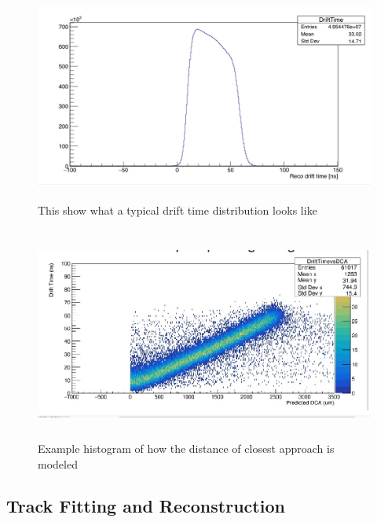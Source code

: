 \documentclass[./Thesis]{subfiles}
\begin{document}
	
\begin{figure}
	\centerline{\includegraphics[height=70mm]{drifttimedist.jpeg}}
	\caption[Drift Time Distibution]{ This show what a typical drift time distribution looks like}
	\label{fig:drifttimedist}
\end{figure} 

\begin{figure}
	\centerline{\includegraphics[height=70mm]{driftdca.jpeg}}
	\caption[Drift Time Distibution vs. The distance of closest approach]{ Example histogram of how the distance of closest approach is modeled	}
	\label{fig:driftdca}
\end{figure} 


\subsection{Track Fitting and Reconstruction}
\end{document}
